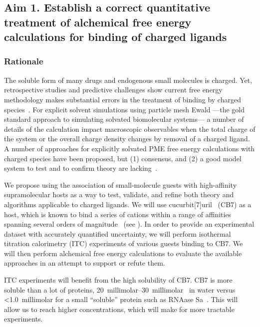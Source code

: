 \documentclass[10pt,final]{article}
\begin{document}
\subsection*{Aim 1. Establish a correct quantitative treatment of alchemical free energy calculations for binding of charged ligands}
\subsubsection*{Rationale}
The soluble form of many drugs and endogenous small molecules is charged. Yet, retrospective studies and predictive challenges show current free energy methodology makes substantial errors in the treatment of binding by charged species~\autocite{Rocklin2013b,Muddana2014a}.
%
For explicit solvent simulations using particle mesh Ewald ---the gold standard approach to simulating solvated biomolecular systems--- a number of details of the calculation impact macroscopic observables when the total charge of the system or the overall charge density changes by removal of a charged ligand.
%
A number of approaches for explicitly solvated PME free energy calculations with charged species have been proposed, but (1) consensus, and (2) a good model system to test and to confirm theory are lacking~\autocite{Reif2013a, Rocklin2013a, Lin2014a}.

We propose using the association of small-molecule guests with high-affinity supramolecular hosts as a way to test, validate, and refine both theory and algorithms applicable to charged ligands.
%
We will use cucurbit[7]uril~\autocite{Lagona2005a} (CB7) as a host, which is known to bind a series of cations within a range of affinities spanning several orders of magnitude~\autocite{Cao2013a} (see ).
%
In order to provide an experimental dataset with accurately quantified uncertainty, we will perform isothermal titration calorimetry (ITC) experiments of various guests binding to CB7.
%
We will then perform alchemical free energy calculations to evaluate the available approaches in an attempt to support or refute them.

%
ITC experiments will benefit from the high solubility of CB7.
%
CB7 is more soluble than a lot of proteins, \SIrange[scientific-notation=false]{20}{30}{millimolar}~\autocite{Lagona2005a} in water versus \textless \SI{1.0}{millimolar} for a small ``soluble'' protein such as RNAase Sa~\autocite{Pace2004a}.
%
This will allow us to reach higher concentrations, which will make for more tractable experiments.
\end{document}
